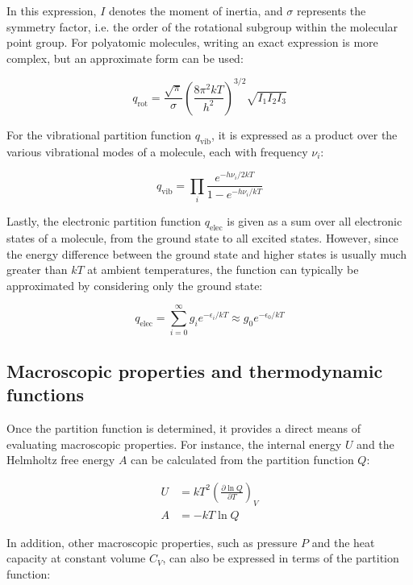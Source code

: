 In this expression, $I$ denotes the moment of inertia, and $\sigma$ represents the symmetry factor, i.e. the order of the rotational subgroup within the molecular point group. For polyatomic molecules, writing an exact expression is more complex, but an approximate form can be used:

\begin{equation}
    q_{\text{rot}} = \frac{\sqrt{\pi}}{\sigma}\left(\frac{8\pi^2kT}{h^2}\right)^{3/2} \sqrt{I_1I_2I_3}
\end{equation}

For the vibrational partition function $q_\text{vib}$, it is expressed as a product over the various vibrational modes of a molecule, each with frequency $\nu_i$:

\begin{equation}
    q_{\text{vib}} = \prod_{i} \frac{e^{-h\nu_i/2kT}}{1-e^{-h\nu_i/kT}}
\end{equation}

Lastly, the electronic partition function $q_\text{elec}$ is given as a sum over all electronic states of a molecule, from the ground state to all excited states. However, since the energy difference between the ground state and higher states is usually much greater than $kT$ at ambient temperatures, the function can typically be approximated by considering only the ground state:

\begin{equation}
    q_{\text{elec}} = \sum_{i=0}^{\infty} g_i e^{-\epsilon_i/kT} \approx g_0 e^{-\epsilon_0/kT}
\end{equation} 



\subsection{Macroscopic properties and thermodynamic functions}

Once the partition function is determined, it provides a direct means of evaluating macroscopic properties. For instance, the internal energy $U$ and the Helmholtz free energy $A$ can be calculated from the partition function $Q$:

\begin{align}
    U &= kT^2 \left(\frac{\partial \ln Q}{\partial T}\right)_V \\
    A &= -kT\ln Q
\end{align}

In addition, other macroscopic properties, such as pressure $P$ and the heat capacity at constant volume $C_V$, can also be expressed in terms of the partition function:

